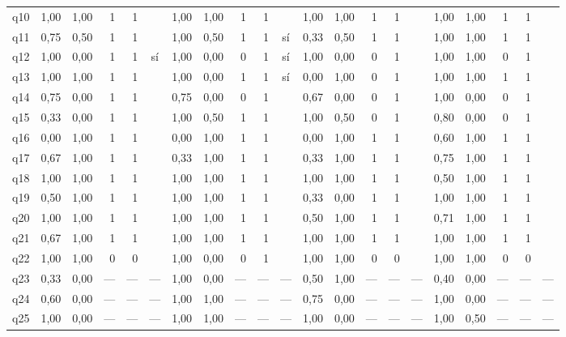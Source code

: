 \begin{scriptsize}
\begin{longtable}{@{}l rrrrc rrrrc rrrrc rrrrc@{}}
q10 & 1,00 & 1,00 & 1 & 1 &  & 1,00 & 1,00 & 1 & 1 &  & 1,00 & 1,00 & 1 & 1 &  & 1,00 & 1,00 & 1 & 1 &  \\
q11 & 0,75 & 0,50 & 1 & 1 &  & 1,00 & 0,50 & 1 & 1 & sí & 0,33 & 0,50 & 1 & 1 &  & 1,00 & 1,00 & 1 & 1 &  \\
q12 & 1,00 & 0,00 & 1 & 1 & sí & 1,00 & 0,00 & 0 & 1 & sí & 1,00 & 0,00 & 0 & 1 &  & 1,00 & 1,00 & 0 & 1 &  \\
q13 & 1,00 & 1,00 & 1 & 1 &  & 1,00 & 0,00 & 1 & 1 & sí & 0,00 & 1,00 & 0 & 1 &  & 1,00 & 1,00 & 1 & 1 &  \\
q14 & 0,75 & 0,00 & 1 & 1 &  & 0,75 & 0,00 & 0 & 1 &  & 0,67 & 0,00 & 0 & 1 &  & 1,00 & 0,00 & 0 & 1 &  \\
q15 & 0,33 & 0,00 & 1 & 1 &  & 1,00 & 0,50 & 1 & 1 &  & 1,00 & 0,50 & 0 & 1 &  & 0,80 & 0,00 & 0 & 1 &  \\
q16 & 0,00 & 1,00 & 1 & 1 &  & 0,00 & 1,00 & 1 & 1 &  & 0,00 & 1,00 & 1 & 1 &  & 0,60 & 1,00 & 1 & 1 &  \\
q17 & 0,67 & 1,00 & 1 & 1 &  & 0,33 & 1,00 & 1 & 1 &  & 0,33 & 1,00 & 1 & 1 &  & 0,75 & 1,00 & 1 & 1 &  \\
q18 & 1,00 & 1,00 & 1 & 1 &  & 1,00 & 1,00 & 1 & 1 &  & 1,00 & 1,00 & 1 & 1 &  & 0,50 & 1,00 & 1 & 1 &  \\
q19 & 0,50 & 1,00 & 1 & 1 &  & 1,00 & 1,00 & 1 & 1 &  & 0,33 & 0,00 & 1 & 1 &  & 1,00 & 1,00 & 1 & 1 &  \\
q20 & 1,00 & 1,00 & 1 & 1 &  & 1,00 & 1,00 & 1 & 1 &  & 0,50 & 1,00 & 1 & 1 &  & 0,71 & 1,00 & 1 & 1 &  \\
q21 & 0,67 & 1,00 & 1 & 1 &  & 1,00 & 1,00 & 1 & 1 &  & 1,00 & 1,00 & 1 & 1 &  & 1,00 & 1,00 & 1 & 1 &  \\
q22 & 1,00 & 1,00 & 0 & 0 &  & 1,00 & 0,00 & 0 & 1 &  & 1,00 & 1,00 & 0 & 0 &  & 1,00 & 1,00 & 0 & 0 &  \\
q23 & 0,33 & 0,00 & --- & --- & --- & 1,00 & 0,00 & --- & --- & --- & 0,50 & 1,00 & --- & --- & --- & 0,40 & 0,00 & --- & --- & --- \\
q24 & 0,60 & 0,00 & --- & --- & --- & 1,00 & 1,00 & --- & --- & --- & 0,75 & 0,00 & --- & --- & --- & 1,00 & 0,00 & --- & --- & --- \\
q25 & 1,00 & 0,00 & --- & --- & --- & 1,00 & 1,00 & --- & --- & --- & 1,00 & 0,00 & --- & --- & --- & 1,00 & 0,50 & --- & --- & --- \\
\bottomrule
\end{longtable}
\end{scriptsize}

